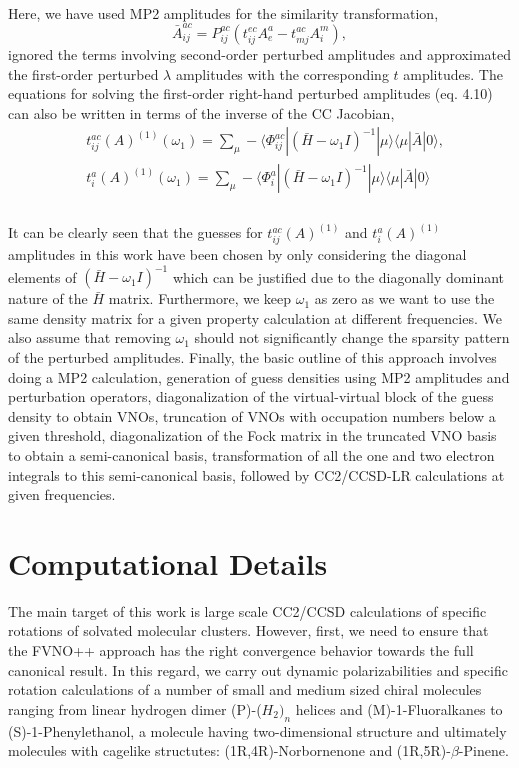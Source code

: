 \\
Here, we have used MP2 amplitudes for the similarity transformation,
\begin{equation}
\bar{A}^{ac}_{ij} = P_{ij}^{ac}(t^{ec}_{ij}A^a_e - t^{ac}_{mj}A^m_i) ,
\end{equation}
ignored the terms involving second-order perturbed amplitudes and 
approximated the first-order perturbed $\lambda$ amplitudes with the 
corresponding $t$ amplitudes. The equations for solving the first-order 
right-hand perturbed amplitudes (eq. 4.10) can also be written in terms
of the inverse of the CC Jacobian,
\\
\begin{equation}
\begin{split}
& t^{ac}_{ij}(A)^{(1)}(\omega_1) = \sum_\mu - \langle\Phi_{ij}^{ac}| {(\bar{H} -\omega_1 I)}^{-1} |
\mu\rangle\langle \mu| \bar{A} | 0\rangle, \\
& t^{a}_{i}(A)^{(1)}(\omega_1) = \sum_\mu -\langle\Phi_{i}^{a}| {(\bar{H} -\omega_1 I)}^{-1} |
\mu\rangle \langle \mu| \bar{A} | 0\rangle \\
\end{split}
\end{equation}
\\
It can be clearly seen that the guesses for $t^{ac}_{ij}(A)^{(1)}$ and 
$t^{a}_{i}(A)^{(1)}$ amplitudes in this work have been chosen by 
only considering the diagonal elements of $(\bar{H} -\omega_1 I)^{-1}$
which can be justified due to the diagonally dominant nature of the
$\bar{H}$ matrix. Furthermore, we keep $\omega_1$ as zero as we 
want to use the same density matrix for a given property calculation at different
frequencies. We also assume that removing $\omega_1$ should not significantly change the 
sparsity pattern of the perturbed amplitudes. Finally, the basic outline of this approach
involves doing a MP2 calculation, generation of guess densities using MP2 amplitudes and 
perturbation operators, diagonalization of the virtual-virtual block of the guess density 
to obtain VNOs, truncation of VNOs with occupation numbers below a given threshold, 
diagonalization of the Fock matrix in the truncated VNO basis to obtain a semi-canonical 
basis, transformation of all the one and two electron integrals to this semi-canonical 
basis, followed by CC2/CCSD-LR calculations at given frequencies.
\section{Computational Details}
The main target of this work is large scale CC2/CCSD calculations of specific 
rotations of solvated molecular clusters. However, first, we need to ensure 
that the FVNO++ approach has the right convergence behavior towards the full
canonical result. In this regard, we carry out dynamic polarizabilities 
and specific rotation calculations of a number of small and medium sized 
chiral molecules ranging from linear hydrogen dimer (P)-($H_2)_n$ helices
and (M)-1-Fluoralkanes to (S)-1-Phenylethanol, a molecule having two-dimensional 
structure and ultimately molecules with cagelike structutes: (1R,4R)-Norbornenone
and (1R,5R)-$\beta$-Pinene. 
